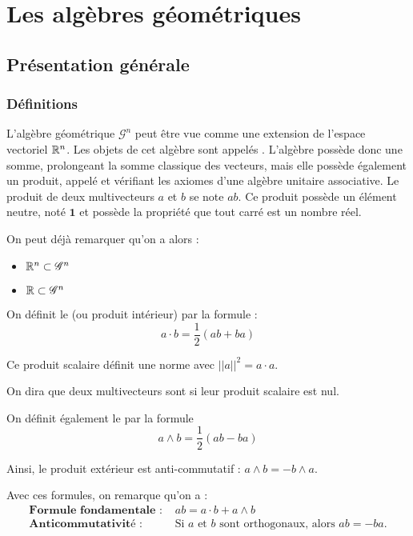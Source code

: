 \section{Les algèbres géométriques}

\subsection{Présentation générale}

\subsubsection{Définitions}

L'algèbre géométrique $\mathscr{G}^n$ peut être vue comme une extension de l'espace vectoriel $\mathbb{R}^n$. Les objets de cet algèbre sont appelés . L'algèbre possède donc une somme, prolongeant la somme classique des vecteurs, mais elle possède également un produit, appelé  et vérifiant les axiomes d'une algèbre unitaire associative. Le produit de deux multivecteurs $a$ et $b$ se note $ab$. Ce produit possède un élément neutre, noté $\bm{1}$ et possède la propriété que tout carré est un nombre réel.  

On peut déjà remarquer qu'on a alors : \begin{itemize}
\item $\mathbb{R}^n \subset \mathscr{G}^n$
\item $\mathbb{R} \subset \mathscr{G}^n$
\end{itemize}

On définit le  (ou produit intérieur) par la formule : $$\boxed{a \cdot b =  \frac{1}{2} (ab+ba)}$$

Ce produit scalaire définit une norme avec $||a||^2 = a \cdot a$.

On dira que deux multivecteurs sont  si leur produit scalaire est nul. 

On définit également le  par la formule $$\boxed{a \wedge b = \frac{1}{2} (ab-ba)}$$

Ainsi, le produit extérieur est anti-commutatif : $a \wedge b  = -b \wedge a $.

Avec ces formules, on remarque qu'on a : \\
\begin{equation*}
\boxed{\begin{array}{ll}
\textbf{Formule fondamentale : }&ab = a \cdot b + a \wedge b \\
\textbf{Anticommutativité : } &\text{Si }a \text{ et } b \text{ sont orthogonaux, alors }ab = -ba.
\end{array}}
\end{equation*} 

